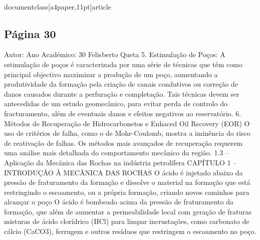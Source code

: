 \\documentclass[a4paper,11pt]{article}
\begin{document}
\subsection*{Página 30}
Autor:
Ano Académico:
30
Felisberto Queta
5. Estimulação de Poços:
A estimulação de poços é caracterizada por uma série de técnicas que têm como principal objectivo maximizar a
produção de um poço, aumentando a produtividade da formação pela criação de canais condutivos ou correção
de danos causados durante a perfuração e completação.
Tais técnicas devem ser antecedidas de um estudo geomecânico, para evitar perda de controlo do fracturamento,
além de eventuais danos e efeitos negativos ao reservatório.
6. Métodos de Recuperação de Hidrocarbonetos e Enhaced Oil Recovery (EOR)
O uso de critérios de falha, como o de Mohr-Coulomb, mostra a iminência do risco de reativação de
falhas. Os métodos mais avançados de recuperação requerem uma análise mais detalhada do
comportamento mecânico da região.
1.3 – Aplicação da Mecânica das Rochas na indústria petrolífera
CAPÍTULO 1 – INTRODUÇÃO À MECÂNICA DAS ROCHAS
O ácido é injetado 
abaixo da pressão de 
fraturamento da 
formação e dissolve o 
material na formação 
que está restringindo 
o escoamento, ou a 
própria formação, 
criando novos 
caminhos para 
alcançar o poço
O ácido é 
bombeado acima 
da pressão de 
fraturamento da 
formação, que 
além de aumentar 
a permeabilidade 
local com geração 
de fraturas
misturas de ácido 
clorídrico (HCl) para 
limpar incrustações, 
como carbonato de 
cálcio (CaCO3), 
ferrugem e outros 
resíduos que 
restringem o 
escoamento no 
poço.
\end{document}
